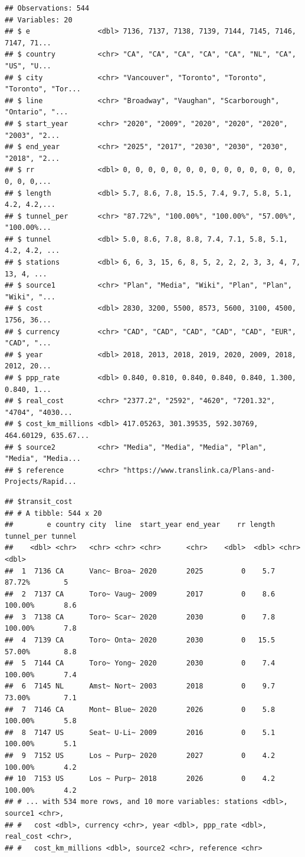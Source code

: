 \documentclass[]{article}
\begin{document}
\begin{verbatim}
## Observations: 544
## Variables: 20
## $ e                <dbl> 7136, 7137, 7138, 7139, 7144, 7145, 7146, 7147, 71...
## $ country          <chr> "CA", "CA", "CA", "CA", "CA", "NL", "CA", "US", "U...
## $ city             <chr> "Vancouver", "Toronto", "Toronto", "Toronto", "Tor...
## $ line             <chr> "Broadway", "Vaughan", "Scarborough", "Ontario", "...
## $ start_year       <chr> "2020", "2009", "2020", "2020", "2020", "2003", "2...
## $ end_year         <chr> "2025", "2017", "2030", "2030", "2030", "2018", "2...
## $ rr               <dbl> 0, 0, 0, 0, 0, 0, 0, 0, 0, 0, 0, 0, 0, 0, 0, 0, 0,...
## $ length           <dbl> 5.7, 8.6, 7.8, 15.5, 7.4, 9.7, 5.8, 5.1, 4.2, 4.2,...
## $ tunnel_per       <chr> "87.72%", "100.00%", "100.00%", "57.00%", "100.00%...
## $ tunnel           <dbl> 5.0, 8.6, 7.8, 8.8, 7.4, 7.1, 5.8, 5.1, 4.2, 4.2, ...
## $ stations         <dbl> 6, 6, 3, 15, 6, 8, 5, 2, 2, 2, 3, 3, 4, 7, 13, 4, ...
## $ source1          <chr> "Plan", "Media", "Wiki", "Plan", "Plan", "Wiki", "...
## $ cost             <dbl> 2830, 3200, 5500, 8573, 5600, 3100, 4500, 1756, 36...
## $ currency         <chr> "CAD", "CAD", "CAD", "CAD", "CAD", "EUR", "CAD", "...
## $ year             <dbl> 2018, 2013, 2018, 2019, 2020, 2009, 2018, 2012, 20...
## $ ppp_rate         <dbl> 0.840, 0.810, 0.840, 0.840, 0.840, 1.300, 0.840, 1...
## $ real_cost        <chr> "2377.2", "2592", "4620", "7201.32", "4704", "4030...
## $ cost_km_millions <dbl> 417.05263, 301.39535, 592.30769, 464.60129, 635.67...
## $ source2          <chr> "Media", "Media", "Media", "Plan", "Media", "Media...
## $ reference        <chr> "https://www.translink.ca/Plans-and-Projects/Rapid...
\end{verbatim}

\begin{verbatim}
## $transit_cost
## # A tibble: 544 x 20
##        e country city  line  start_year end_year    rr length tunnel_per tunnel
##    <dbl> <chr>   <chr> <chr> <chr>      <chr>    <dbl>  <dbl> <chr>       <dbl>
##  1  7136 CA      Vanc~ Broa~ 2020       2025         0    5.7 87.72%        5  
##  2  7137 CA      Toro~ Vaug~ 2009       2017         0    8.6 100.00%       8.6
##  3  7138 CA      Toro~ Scar~ 2020       2030         0    7.8 100.00%       7.8
##  4  7139 CA      Toro~ Onta~ 2020       2030         0   15.5 57.00%        8.8
##  5  7144 CA      Toro~ Yong~ 2020       2030         0    7.4 100.00%       7.4
##  6  7145 NL      Amst~ Nort~ 2003       2018         0    9.7 73.00%        7.1
##  7  7146 CA      Mont~ Blue~ 2020       2026         0    5.8 100.00%       5.8
##  8  7147 US      Seat~ U-Li~ 2009       2016         0    5.1 100.00%       5.1
##  9  7152 US      Los ~ Purp~ 2020       2027         0    4.2 100.00%       4.2
## 10  7153 US      Los ~ Purp~ 2018       2026         0    4.2 100.00%       4.2
## # ... with 534 more rows, and 10 more variables: stations <dbl>, source1 <chr>,
## #   cost <dbl>, currency <chr>, year <dbl>, ppp_rate <dbl>, real_cost <chr>,
## #   cost_km_millions <dbl>, source2 <chr>, reference <chr>
\end{verbatim}
\end{document}
